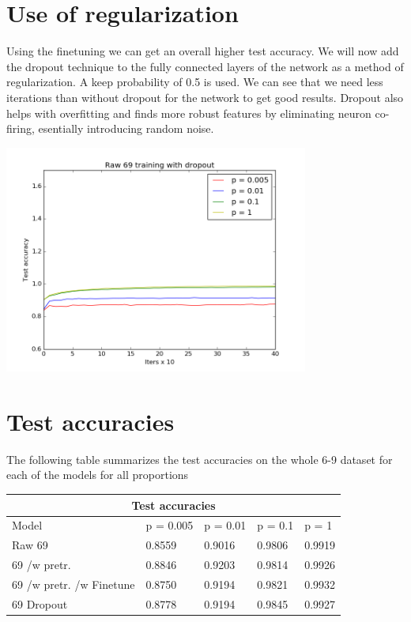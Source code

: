 \documentclass[11pt]{article}
\begin{document}
\section{Use of regularization}
Using the finetuning we can get an overall higher test accuracy.
We will now add the dropout technique to the fully connected layers of the network as a method of regularization.
A keep probability of 0.5 is used. We can see that we need less iterations than without dropout for the network to get good results. Dropout also helps with overfitting and finds more robust features by eliminating neuron co-firing, esentially introducing random noise.

\includegraphics[width=10cm]{Raw69trainingwithdropout}

\section{Test accuracies}
The following table summarizes the test accuracies on the whole 6-9 dataset
for each of the models for all proportions \\ 

\begin{tabular}{ |p{4cm}||p{2cm}|p{2cm}|p{2cm}|p{2cm}| }
 \hline
 \multicolumn{5}{|c|}{Test accuracies} \\
 \hline
Model & p = 0.005 & p = 0.01 & p = 0.1 & p = 1\\
 \hline
 Raw 69                       &   0.8559     & 0.9016    &  0.9806   & 0.9919\\
 69 /w pretr.                 &   0.8846     & 0.9203    &  0.9814   & 0.9926\\
 69 /w pretr. /w Finetune     &   0.8750     & 0.9194    &  0.9821   & 0.9932\\
 69 Dropout                   &   0.8778     & 0.9194    &  0.9845   & 0.9927\\
 \hline
\end{tabular}
\end{document}
